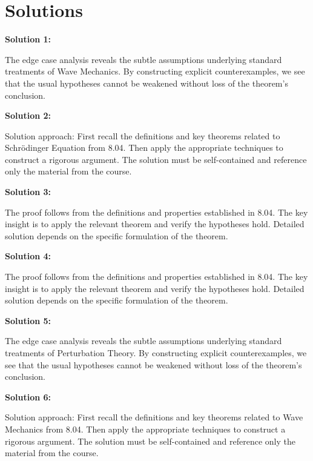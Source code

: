 \documentclass[12pt,a4paper]{exam}
\begin{document}
\newpage
\section*{Solutions}

\textbf{Solution 1:}

The edge case analysis reveals the subtle assumptions underlying standard treatments of Wave Mechanics. By constructing explicit counterexamples, we see that the usual hypotheses cannot be weakened without loss of the theorem's conclusion.

\vspace{0.5cm}

\textbf{Solution 2:}

Solution approach: First recall the definitions and key theorems related to Schrödinger Equation from 8.04. Then apply the appropriate techniques to construct a rigorous argument. The solution must be self-contained and reference only the material from the course.

\vspace{0.5cm}

\textbf{Solution 3:}

The proof follows from the definitions and properties established in 8.04. The key insight is to apply the relevant theorem and verify the hypotheses hold. Detailed solution depends on the specific formulation of the theorem.

\vspace{0.5cm}

\textbf{Solution 4:}

The proof follows from the definitions and properties established in 8.04. The key insight is to apply the relevant theorem and verify the hypotheses hold. Detailed solution depends on the specific formulation of the theorem.

\vspace{0.5cm}

\textbf{Solution 5:}

The edge case analysis reveals the subtle assumptions underlying standard treatments of Perturbation Theory. By constructing explicit counterexamples, we see that the usual hypotheses cannot be weakened without loss of the theorem's conclusion.

\vspace{0.5cm}

\textbf{Solution 6:}

Solution approach: First recall the definitions and key theorems related to Wave Mechanics from 8.04. Then apply the appropriate techniques to construct a rigorous argument. The solution must be self-contained and reference only the material from the course.
\end{document}
